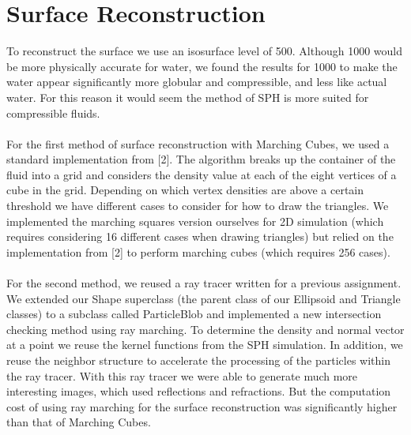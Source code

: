 \documentclass[11pt]{article}
\begin{document}
\section*{Surface Reconstruction}
To reconstruct the surface we use an isosurface level of 500. Although 1000 would be more physically accurate for water, we found the results for 1000 to make the water appear significantly more globular and compressible, and less like actual water. For this reason it would seem the method of SPH is more suited for compressible fluids.
\\
\\
For the first method of surface reconstruction with Marching Cubes, we used a standard implementation from [2]. The algorithm breaks up the container of the fluid into a grid and considers the density value at each of the eight vertices of a cube in the grid. Depending on which vertex densities are above a certain threshold we have different cases to consider for how to draw the triangles. We implemented the marching squares version ourselves for 2D simulation (which requires considering 16 different cases when drawing triangles) but relied on the implementation from [2] to perform marching cubes (which requires 256 cases).
\\
\\
For the second method, we reused a ray tracer written for a previous assignment. We extended our Shape superclass (the parent class of our Ellipsoid and Triangle classes) to a subclass called ParticleBlob and implemented a new intersection checking method using ray marching. To determine the density and normal vector at a point we reuse the kernel functions from the SPH simulation. In addition, we reuse the neighbor structure to accelerate the processing of the particles within the ray tracer. With this ray tracer we were able to generate much more interesting images, which used reflections and refractions. But the computation cost of using ray marching for the surface reconstruction was significantly higher than that of Marching Cubes.
\end{document}
